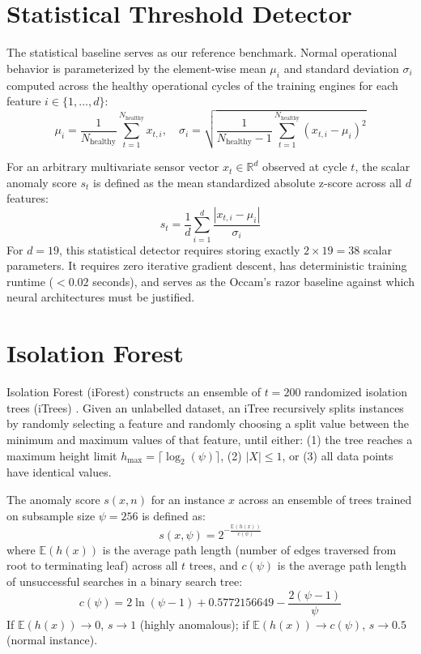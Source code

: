\documentclass[12pt,a4paper,oneside]{report}
\begin{document}
\section{Statistical Threshold Detector}
The statistical baseline serves as our reference benchmark. Normal operational behavior is parameterized by the element-wise mean $\mu_i$ and standard deviation $\sigma_i$ computed across the healthy operational cycles of the training engines for each feature $i \in \{1, \dots, d\}$:
\begin{equation}
    \mu_i = \frac{1}{N_{\text{healthy}}} \sum_{t=1}^{N_{\text{healthy}}} x_{t,i}, \quad \sigma_i = \sqrt{\frac{1}{N_{\text{healthy}}-1} \sum_{t=1}^{N_{\text{healthy}}} (x_{t,i} - \mu_i)^2}
\end{equation}

For an arbitrary multivariate sensor vector $x_t \in \mathbb{R}^d$ observed at cycle $t$, the scalar anomaly score $s_t$ is defined as the mean standardized absolute z-score across all $d$ features:
\begin{equation}
    s_t = \frac{1}{d} \sum_{i=1}^d \frac{|x_{t,i} - \mu_i|}{\sigma_i}
    \label{eq:stat_score}
\end{equation}
For $d = 19$, this statistical detector requires storing exactly $2 \times 19 = 38$ scalar parameters. It requires zero iterative gradient descent, has deterministic training runtime ($<0.02$ seconds), and serves as the Occam's razor baseline against which neural architectures must be justified.

\section{Isolation Forest}
Isolation Forest (iForest) constructs an ensemble of $t = 200$ randomized isolation trees (iTrees) \cite{liu2008isolation}. Given an unlabelled dataset, an iTree recursively splits instances by randomly selecting a feature and randomly choosing a split value between the minimum and maximum values of that feature, until either: (1) the tree reaches a maximum height limit $h_{\max} = \lceil \log_2(\psi) \rceil$, (2) $|X| \le 1$, or (3) all data points have identical values.

The anomaly score $s(x, n)$ for an instance $x$ across an ensemble of trees trained on subsample size $\psi = 256$ is defined as:
\begin{equation}
    s(x, \psi) = 2^{-\frac{\mathbb{E}(h(x))}{c(\psi)}}
\end{equation}
where $\mathbb{E}(h(x))$ is the average path length (number of edges traversed from root to terminating leaf) across all $t$ trees, and $c(\psi)$ is the average path length of unsuccessful searches in a binary search tree:
\begin{equation}
    c(\psi) = 2 \ln(\psi - 1) + 0.5772156649 - \frac{2(\psi - 1)}{\psi}
\end{equation}
If $\mathbb{E}(h(x)) \rightarrow 0$, $s \rightarrow 1$ (highly anomalous); if $\mathbb{E}(h(x)) \rightarrow c(\psi)$, $s \rightarrow 0.5$ (normal instance).
\end{document}

